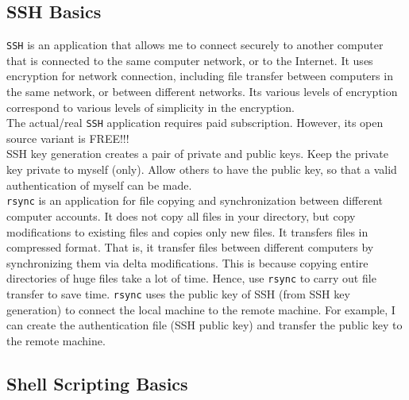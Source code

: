 \subsection{SSH Basics}
\label{ssec:SSHBasics}


{\tt SSH} is an application that allows me to connect securely to another computer that is connected to the same computer network, or to the Internet. It uses encryption for network connection, including file transfer between computers in the same network, or between different networks. Its various levels of encryption correspond to various levels of simplicity in the encryption. \\


The actual/real {\tt SSH} application requires paid subscription. However, its open source variant is FREE!!! \\

SSH key generation creates a pair of private and public keys. Keep the private key private to myself (only). Allow others to have the public key, so that a valid authentication of myself can be made. \\










{\tt rsync} is an application for file copying and synchronization between different computer accounts. It does not copy all files in your directory, but copy modifications to existing files and copies only new files. It transfers files in compressed format. That is, it transfer files between different computers by synchronizing them via delta modifications. This is because copying entire directories of huge files take a lot of time. Hence, use {\tt rsync} to carry out file transfer to save time. {\tt rsync} uses the public key of SSH (from SSH key generation) to connect the local machine to the remote machine. For example, I can create the authentication file (SSH public key) and transfer the public key to the remote machine. \\






\subsection{Shell Scripting Basics}
\label{ssec:ShellScriptingBasics}

